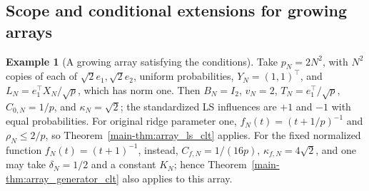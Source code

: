 \documentclass[11pt,a4paper,leqno]{article}
\numberwithin{equation}{section}
\numberwithin{figure}{section}
\numberwithin{table}{section}
\theoremstyle{plain}
\theoremstyle{definition}
\newtheorem{example}[lemma]{Example}
\theoremstyle{remark}
\begin{document}
\subsection{Scope and conditional extensions for growing arrays}
\label{supp:sec:array-details}
\begin{example}[A growing array satisfying the conditions]
\label{supp:ex:array-scope}
Take \(p_N=2N^2\), with \(N^2\) copies of each of \(\sqrt2e_1,\sqrt2e_2\),
uniform probabilities, \(Y_N=(1,1)^\top\), and
\(L_N=e_1^\top X_N/\sqrt p\), which has norm one.
Then \(B_N=I_2\), \(v_N=2\), \(T_N=e_1^\top/\sqrt p\),
\(C_{0,N}=1/p\), and \(\kappa_N=\sqrt2\); the standardized LS influences
are \(+1\) and \(-1\) with equal probabilities.
For original ridge parameter one, \(f_N(t)=(t+1/p)^{-1}\) and
\(\rho_N\le2/p\), so Theorem~\ref{main-thm:array_ls_clt} applies.
For the fixed normalized function \(f_N(t)=(t+1)^{-1}\), instead,
\(C_{f,N}=1/(16p)\), \(\kappa_{f,N}=4\sqrt2\), and one may take
\(\delta_N=1/2\) and a constant \(K_N\); hence
Theorem~\ref{main-thm:array_generator_clt} also applies to this array.
\end{example}
\end{document}
